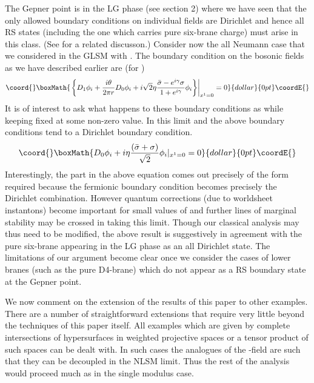 \documentclass[a4paper,12pt]{article}
\begin{document}
The Gepner point is in the LG phase (see section 2) 
where  we have seen that the only allowed boundary conditions
on individual fields are Dirichlet and hence all RS states
(including the one which carries pure six-brane charge)
must arise in this class. (See \cite{doug-diac} for a related
discusson.)  Consider now the all Neumann case
that we considered in the GLSM with \coordHE{}. 
The boundary condition on the bosonic fields as we have described
earlier are
(for \coordHE{})
$$\coord{}\boxMath{
\left.\left\{D_1\phi_i+\frac{i\theta}{2\pi r}
D_0\phi_i+i\sqrt{2}\eta
\frac{{\bar \sigma}-e^{i\gamma}\sigma}{1+e^{i\gamma}}\phi_i
\right\}\right|_{x^1=0}=0 
}{dollar}{0pt}\coordE{}$$
It is of interest to ask what happens to these boundary conditions
as \coordHE{} while keeping \myHighlight{$\theta$}\coordHE{} fixed at some non-zero
value. In this limit \coordHE{} and the above boundary
conditions tend to a Dirichlet boundary condition.
$$\coord{}\boxMath{
D_0\phi_i+i\eta {{({\bar \sigma}+\sigma)}\over\sqrt{2}}\phi_i|_{x^1=0}=0 
}{dollar}{0pt}\coordE{}$$
Interestingly, the \myHighlight{$\sigma$}\coordHE{} part in the above equation
comes out precisely of the form required because the fermionic
boundary condition becomes precisely the Dirichlet combination.
However quantum corrections (due to worldsheet
instantons) become important for small values of \coordHE{} and further 
lines of marginal stability may be crossed in taking this limit. Though our
classical analysis may thus need to be modified, the above
result  is suggestively in agreement with the pure six-brane
appearing in the LG phase as an all Dirichlet state.
The limitations of our argument become clear once we consider
the cases of lower branes (such as the pure D4-brane) which do not
appear as a RS boundary state at the Gepner point.

We now comment on the extension of the results of this paper to other
examples. There are a number of straightforward extensions that require
very little beyond the techniques of this paper itself. 
All examples which are given by complete intersections of hypersurfaces
in weighted projective spaces or a tensor product of such spaces can be dealt
with. In such cases the analogues of the \coordHE{}-field are such that they
can be decoupled in the NLSM limit. Thus the rest of the analysis would
proceed much as in the single modulus case.
\end{document}
